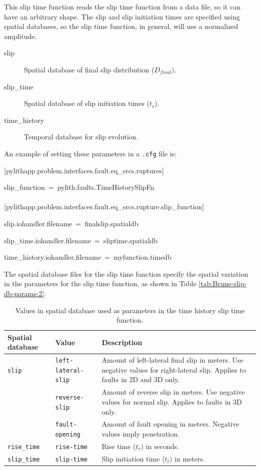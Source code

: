 This slip time function reads the slip time function from a data file,
so it can have an arbitrary shape. The slip and slip initiation times
are specified using spatial databases, so the slip time function,
in general, will use a normalized amplitude.
\begin{description}
\item [{slip}] Spatial database of final slip distribution ($D_{final})$.
\item [{slip\_time}] Spatial database of slip initiation times ($t_{r}$).
\item [{time\_history}] Temporal database for slip evolution.
\end{description}
An example of setting these parameters in a \texttt{.cfg} file is:
\begin{lyxcode}
{[}pylithapp.problem.interfaces.fault.eq\_srcs.ruptures{]}

slip\_function~=~pylith.faults.TimeHistorySlipFn~\\
~\\
{[}pylithapp.problem.interfaces.fault.eq\_srcs.rupture.slip\_function{]}

slip.iohandler.filename~=~finalslip.spatialdb

slip\_time.iohandler.filename~=~sliptime.spatialdb

time\_history.iohandler.filename~=~myfunction.timedb
\end{lyxcode}
The spatial database files for the slip time function specify the
spatial variation in the parameters for the slip time function, as
shown in Table \vref{tab:Brune-slip-db-params-2}.

\noindent \begin{center}
\begin{table}[H]
\noindent \centering{}\caption{\label{tab:Brune-slip-db-params-2}Values in spatial database used
as parameters in the time history slip time function.}
\medskip{}
\begin{tabular}{|l|l|>{\raggedright}p{2.5in}|}
\hline 
\textbf{Spatial database} & \textbf{Value} & \textbf{Description}\tabularnewline
\hline 
\hline 
\texttt{slip} & \texttt{left-lateral-slip} & Amount of left-lateral final slip in meters. Use negative values for
right-lateral slip. Applies to faults in 2D and 3D only.\tabularnewline
 & \texttt{reverse-slip} & Amount of reverse slip in meters. Use negative values for normal slip.
Applies to faults in 3D only.\tabularnewline
 & \texttt{fault-opening} & Amount of fault opening in meters. Negative values imply penetration.\tabularnewline
\hline 
\texttt{rise\_time} & \texttt{rise-time} & Rise time ($t_{r})$ in seconds.\tabularnewline
\hline 
\texttt{slip\_time} & \texttt{slip-time} & Slip initiation time ($t_{t})$ in meters.\tabularnewline
\hline 
\end{tabular}
\end{table}

\par\end{center}


